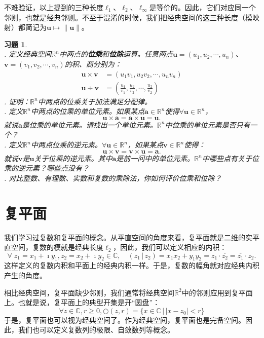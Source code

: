 \documentclass[12pt,UTF8]{ctexbook}
\newcommand{\nji}[2]{\displaystyle\left( #1 \,|\, #2\right)}
\theoremstyle{definition}
\theoremstyle{plain}
\newtheorem{xt}{习题}[section]
\begin{document}
不难验证，以上提到的三种长度$\ell_1$、$\ell_2$、$\ell_{\infty}$是等价的。因此，它们对应同一个邻则，也就是经典邻则。不至于混淆的时候，我们把经典空间的这三种长度（模映射）都简记为$\mathbf{u}\mapsto \|\mathbf{u}\|$。

\begin{xt}
    \mbox{} \\
    . 定义经典空间$\mathbb{R}^n$中两点的\textbf{位乘}和\textbf{位除}运算。任意两点$\mathbf{u} = (u_1, u_2, \cdots, u_n)$、$\mathbf{v} = (v_1, v_2, \cdots, v_n)$的积、商分别为：
    \begin{align*}
        \mathbf{u} \times \mathbf{v} &= (u_1 v_1, u_2 v_2, \cdots, u_n v_n) \\
        \mathbf{u} \div \mathbf{v} &= \left(\frac{u_1}{v_1}, \frac{u_2}{v_2}, \cdots, \frac{u_2}{v_2}\right)
    \end{align*}
    . 证明：$\mathbb{R}^n$中两点的位乘关于加法满足分配律。\\
    . 定义$\mathbb{R}^n$中两点的位乘的单位元素。如果某点$\mathbf{a}\in\mathbb{R}^n$使得$\forall \mathbf{u}\in\mathbb{R}^n$，
    $$\mathbf{u}\times \mathbf{a} = \mathbf{a}\times \mathbf{u} = \mathbf{u}.  $$
    就说$\mathbf{a}$是位乘的单位元素。请找出一个单位元素。$\mathbb{R}^n$中位乘的单位元素是否只有一个？\\
    . 定义$\mathbb{R}^n$中两点位乘的逆元素。$\forall \mathbf{u}\in\mathbb{R}^n$，如果某点$\mathbf{v}\in\mathbb{R}^n$使得：
    $$\mathbf{u}\times \mathbf{v} = \mathbf{v}\times \mathbf{u} = \mathbf{a}.  $$
    就说$\mathbf{v}$是$\mathbf{u}$关于位乘的逆元素。其中$\mathbf{a}$是前一问中的单位元素。$\mathbb{R}^n$中哪些点有关于位乘的逆元素？哪些点没有？\\
    . 对比整数、有理数、实数和复数的乘除法，你如何评价位乘和位除？
\end{xt}

\section{复平面}

我们学习过复数和复平面的概念。从平直空间的角度来看，复平面就是二维的实平直空间，复数的模就是经典长度$\ell_2$，因此，我们可以定义相应的内积：
$$ \forall \; z_1 = x_1 + \imath y_1, z_2 = x_2 + \imath y_2 \in \mathbb{C}, \quad \nji{z_1}{z_2} = x_1x_2 + y_1y_2 = z_1 \cdot \overline{z_2} = \overline{z_1}\cdot z_2. $$
这样定义的复数内积和平面上的经典内积一样。于是，复数的幅角就对应经典内积产生的角度。

相比经典空间，复平面缺少邻则，我们通常将经典空间$\mathbb{R}^2$中的邻则应用到复平面上。也就是说，复平面上的典型开集是开“圆盘”：
$$ \forall z \in \mathbb{C}, r\geqslant 0,  \bigcirc(z, r) = \{x \in \mathbb{C} \, | \, |x - z_0| < r \} $$
于是，复平面也可以视为经典空间了。作为经典空间，复平面也是完备空间。因此，我们也可以定义复数列的极限、自敛数列等概念。
\end{document}
